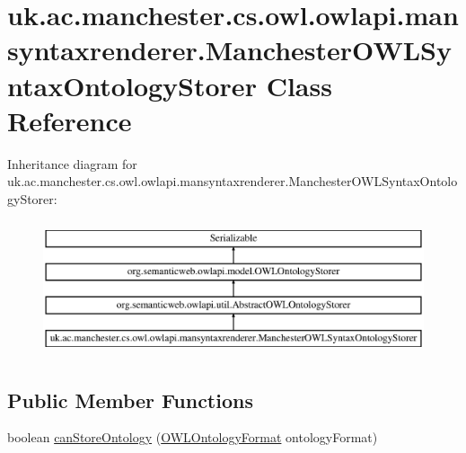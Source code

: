 \hypertarget{classuk_1_1ac_1_1manchester_1_1cs_1_1owl_1_1owlapi_1_1mansyntaxrenderer_1_1_manchester_o_w_l_syntax_ontology_storer}{\section{uk.\-ac.\-manchester.\-cs.\-owl.\-owlapi.\-mansyntaxrenderer.\-Manchester\-O\-W\-L\-Syntax\-Ontology\-Storer Class Reference}
\label{classuk_1_1ac_1_1manchester_1_1cs_1_1owl_1_1owlapi_1_1mansyntaxrenderer_1_1_manchester_o_w_l_syntax_ontology_storer}
}
Inheritance diagram for uk.\-ac.\-manchester.\-cs.\-owl.\-owlapi.\-mansyntaxrenderer.\-Manchester\-O\-W\-L\-Syntax\-Ontology\-Storer\-:\begin{figure}[H]
\begin{center}
\leavevmode
\includegraphics[height=4.000000cm]{classuk_1_1ac_1_1manchester_1_1cs_1_1owl_1_1owlapi_1_1mansyntaxrenderer_1_1_manchester_o_w_l_syntax_ontology_storer}
\end{center}
\end{figure}
\subsection*{Public Member Functions}
\begin{DoxyCompactItemize}
\item 
boolean \hyperlink{classuk_1_1ac_1_1manchester_1_1cs_1_1owl_1_1owlapi_1_1mansyntaxrenderer_1_1_manchester_o_w_l_syntax_ontology_storer_a759a9b25c95d2cda72cfc9cadd74c499}{can\-Store\-Ontology} (\hyperlink{classorg_1_1semanticweb_1_1owlapi_1_1model_1_1_o_w_l_ontology_format}{O\-W\-L\-Ontology\-Format} ontology\-Format)
\end{DoxyCompactItemize}
